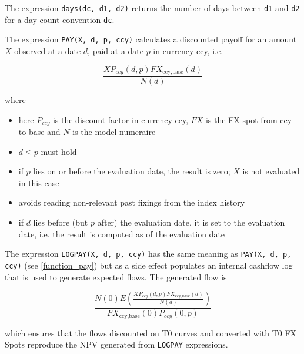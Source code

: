 
The expression \verb+days(dc, d1, d2)+ returns the number of days between \verb+d1+ and \verb+d2+ for a day count
convention \verb+dc+.

\label{function_pay}

The expression {\tt PAY(X, d, p, ccy)} calculates a discounted payoff for an amount $X$ observed at a date $d$, paid at a
date $p$ in currency ccy, i.e.
  
\begin{equation}
  \frac{X P_{ccy}(d,p) FX_{\text{ccy},\text{base}}(d)}{N(d)}
\end{equation}

where
\begin{itemize}
\item here $P_{ccy}$ is the discount factor in currency ccy, $FX$ is the FX spot from ccy to base and $N$ is the model
  numeraire
\item $d\leq p$ must hold
\item if $p$ lies on or before the evaluation date, the result is zero; $X$ is not evaluated in this case
\item avoids reading non-relevant past fixings from the index history
\item if $d$ lies before (but $p$ after) the evaluation date, it is set to the evaluation date, i.e. the result is
  computed as of the evaluation date
\end{itemize}

\label{function_logpay}

The expression {\tt LOGPAY(X, d, p, ccy)} has the same meaning as {\tt PAY(X, d, p, ccy)} (see \ref{function_pay}) but
as a side effect populates an internal cashflow log that is used to generate expected flows. The generated flow is

\begin{equation}
  \frac{ N(0) E\left(\frac{X P_{ccy}(d,p) FX_{\text{ccy},\text{base}}(d)}{N(d)}\right) }{ FX_{\text{ccy},\text{base}}(0) P_{ccy}(0,p) }
\end{equation}

which ensures that the flows discounted on T0 curves and converted with T0 FX Spots reproduce the NPV generated from
\verb+LOGPAY+ expressions.

